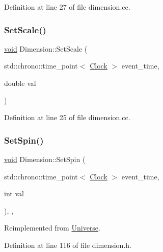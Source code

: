 Definition at line 27 of file dimension.\+cc.

\mbox{\label{class_dimension_a7f655ea002e8f9614a8c5cfa1807c49c}} 
\subsubsection{\texorpdfstring{Set\+Scale()}{SetScale()}}
{\footnotesize\ttfamily \mbox{\hyperlink{glad_8h_a950fc91edb4504f62f1c577bf4727c29}{void}} Dimension\+::\+Set\+Scale (\begin{DoxyParamCaption}\item[{std\+::chrono\+::time\+\_\+point$<$ \mbox{\hyperlink{universe_8h_a0ef8d951d1ca5ab3cfaf7ab4c7a6fd80}{Clock}} $>$}]{event\+\_\+time,  }\item[{double}]{val }\end{DoxyParamCaption})}



Definition at line 25 of file dimension.\+cc.

\mbox{\label{class_dimension_a8d73c050c67b0226572b4a1b08ae6594}} 
\subsubsection{\texorpdfstring{Set\+Spin()}{SetSpin()}}
{\footnotesize\ttfamily \mbox{\hyperlink{glad_8h_a950fc91edb4504f62f1c577bf4727c29}{void}} Dimension\+::\+Set\+Spin (\begin{DoxyParamCaption}\item[{std\+::chrono\+::time\+\_\+point$<$ \mbox{\hyperlink{universe_8h_a0ef8d951d1ca5ab3cfaf7ab4c7a6fd80}{Clock}} $>$}]{event\+\_\+time,  }\item[{int}]{val }\end{DoxyParamCaption})\hspace{0.3cm}{\ttfamily [inline]}, {\ttfamily [final]}, {\ttfamily [virtual]}}



Reimplemented from \mbox{\hyperlink{class_universe_ae2ae1c3b3e4cde2c18f5f6a814761ec8}{Universe}}.



Definition at line 116 of file dimension.\+h.

